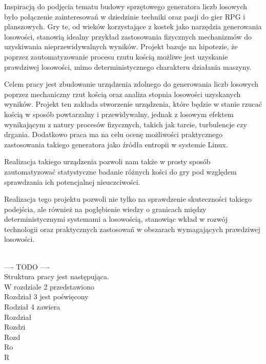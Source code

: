 Inspiracją do podjęcia tematu budowy sprzętowego generatora liczb losowych było połączenie zainteresowań w dziedzinie techniki oraz pasji do gier RPG i planszowych.
Gry te, od wieków korzystające z kostek jako narzędzia generowania losowości, stanowią idealny przykład zastosowania fizycznych mechanizmów do uzyskiwania nieprzewidywalnych wyników.
Projekt bazuje na hipotezie, że poprzez zautomatyzowanie procesu rzutu kością możliwe jest uzyskanie prawdziwej losowości, mimo deterministycznego charakteru działania maszyny.

Celem pracy jest zbudowanie urządzenia zdolnego do generowania liczb losowych poprzez mechaniczny rzut kością oraz analiza stopnia losowości uzyskanych wyników.
Projekt ten zakłada stworzenie urządzenia, które będzie w stanie rzucać kością w sposób powtarzalny i przewidywalny,
jednak z losowym efektem wynikającym z natury procesów fizycznych, takich jak tarcie, turbulencje czy drgania.
Dodatkowo praca ma na celu ocenę możliwości praktycznego zastosowania takiego generatora jako źródła entropii w systemie Linux.

Realizacja takiego urządzenia pozwoli nam także w prosty sposób zautomatyzować statystyczne badanie różnych kości do gry pod względem sprawdzania ich potencjalnej nieuczciwości.

Realizacja tego projektu pozwoli nie tylko na sprawdzenie skuteczności takiego podejścia,
ale również na pogłębienie wiedzy o granicach między deterministycznymi systemami a losowością,
stanowiąc wkład w rozwój technologii oraz praktycznych zastosowań w obszarach wymagających prawdziwej losowości.

\\
---- TODO ---- \\
Struktura pracy jest następująca. \\
W rozdziale 2 przedstawiono \\
Rozdział 3 jest poświęcony \\
Rodział 4 zawiera \\
Rozdział \\
Rozdzi \\
Rozd \\
Ro \\
R \\


